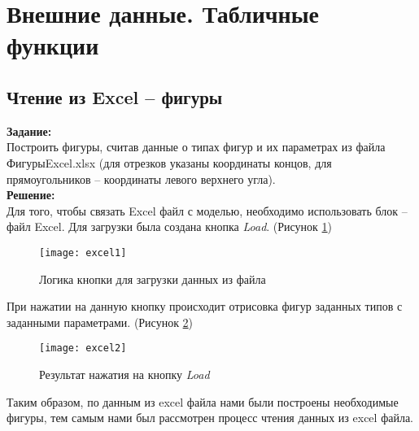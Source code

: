 \section*{Внешние данные. Табличные функции}
\subsection*{Чтение из Excel -- фигуры}

\textbf{Задание:}\\
Построить фигуры, считав данные о типах фигур и их параметрах из файла ФигурыExcel.xlsx (для отрезков указаны координаты концов, для прямоугольников -- координаты левого верхнего угла).\\

\textbf{Решение:}\\
Для того, чтобы связать Excel файл с моделью, необходимо использовать блок -- файл Excel. Для загрузки была создана кнопка \textit{Load}. (Рисунок \ref{fig:excel1})
\begin{figure}[h]
	\centering \texttt{[image: excel1]}
	\caption{Логика кнопки для загрузки данных из файла}
	\label{fig:excel1}
\end{figure}

\newpage

При нажатии на данную кнопку происходит отрисовка фигур заданных типов с заданными параметрами. (Рисунок \ref{fig:excel2})
\begin{figure}[h]
	\centering \texttt{[image: excel2]}
	\caption{Результат нажатия на кнопку \textit{Load}}
	\label{fig:excel2}
\end{figure}

Таким образом, по данным из excel файла нами были построены необходимые фигуры, тем самым нами был рассмотрен процесс чтения данных из excel файла.